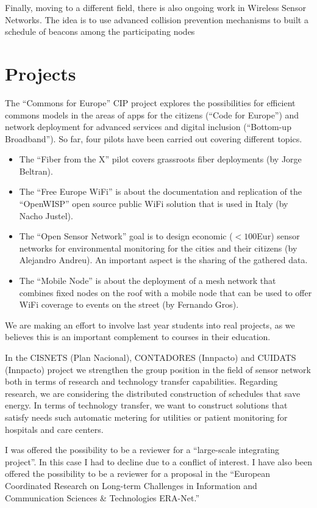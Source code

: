 \documentclass[a4paper,twocolumns]{article}%
\begin{document}
Finally, moving to a different field, there is also ongoing work in Wireless Sensor Networks.
The idea is to use advanced collision prevention mechanisms to built a schedule of beacons among the participating nodes \cite{cano2013iri}

\section{Projects}

The ``Commons for Europe'' CIP project explores the possibilities for efficient commons models in the areas of apps for the citizens (``Code for Europe'') and network deployment for advanced services and digital inclusion (``Bottom-up Broadband'').
So far, four pilots have been carried out covering different topics.
\begin{itemize}
\item The ``Fiber from the X'' pilot covers grassroots fiber deployments (by Jorge Beltran).
\item The ``Free Europe WiFi'' is about the documentation and replication of the ``OpenWISP'' open source public WiFi solution that is used in Italy (by Nacho Justel).
\item The ``Open Sensor Network'' goal is to design economic ($<100$Eur) sensor networks for environmental monitoring for the cities and their citizens (by Alejandro Andreu). 
An important aspect is the sharing of the gathered data.
\item The ``Mobile Node'' is about the deployment of a mesh network that combines fixed nodes on the roof with a mobile node that can be used to offer WiFi coverage to events on the street (by Fernando Gros).
\end{itemize}

We are making an effort to involve last year students into real projects, as we believes this is an important complement to courses in their education.

In the CISNETS (Plan Nacional), CONTADORES (Innpacto) and CUIDATS (Innpacto) project we strengthen the group position in the field of sensor network both in terms of research and technology transfer capabilities.
Regarding research, we are considering the distributed construction of schedules that save energy.
In terms of technology transfer, we want to construct solutions that satisfy needs such automatic metering for utilities or patient monitoring for hospitals and care centers.

I was offered the possibility to be a reviewer for a ``large-scale integrating project''.
In this case I had to decline due to a conflict of interest.
I have also been offered the possibility to be a reviewer for a proposal in the ``European Coordinated Research on Long-term Challenges in Information and Communication Sciences \& Technologies ERA-Net.''
\end{document}
